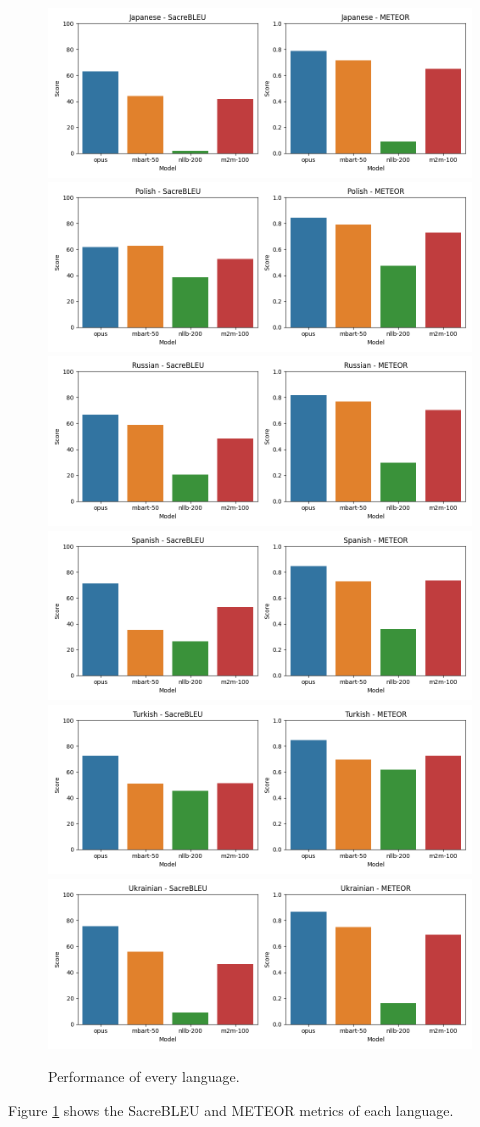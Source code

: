 \documentclass[a4paper]{article}
\begin{document}
\begin{figure}[htbp]
    \includegraphics[width=0.49\linewidth]{figures/japanese_all_metrics.png}
    \includegraphics[width=0.49\linewidth]{figures/polish_all_metrics.png}
    \includegraphics[width=0.49\linewidth]{figures/russian_all_metrics.png}
    \includegraphics[width=0.49\linewidth]{figures/spanish_all_metrics.png}
    \includegraphics[width=0.49\linewidth]{figures/turkish_all_metrics.png}
    \includegraphics[width=0.49\linewidth]{figures/ukrainian_all_metrics.png}
    \caption{Performance of every language.}
    \label{fig:lang_metrics}
\end{figure}

Figure \ref{fig:lang_metrics} shows the SacreBLEU and METEOR metrics of each language.
\end{document}
